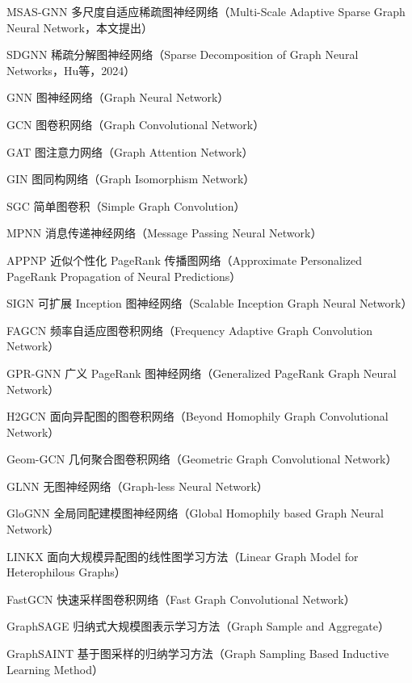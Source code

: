 
\begin{denotation}[4.0cm]

  \item[MSAS-GNN] 多尺度自适应稀疏图神经网络（Multi-Scale Adaptive Sparse Graph Neural Network，本文提出）
  \item[SDGNN] 稀疏分解图神经网络（Sparse Decomposition of Graph Neural Networks，Hu等，2024）
  \item[GNN] 图神经网络（Graph Neural Network）
  \item[GCN] 图卷积网络（Graph Convolutional Network）
  \item[GAT] 图注意力网络（Graph Attention Network）
  \item[GIN] 图同构网络（Graph Isomorphism Network）
  \item[SGC] 简单图卷积（Simple Graph Convolution）
  \item[MPNN] 消息传递神经网络（Message Passing Neural Network）
  \item[APPNP] 近似个性化 PageRank 传播图网络（Approximate Personalized PageRank Propagation of Neural Predictions）
  \item[SIGN] 可扩展 Inception 图神经网络（Scalable Inception Graph Neural Network）
  \item[FAGCN] 频率自适应图卷积网络（Frequency Adaptive Graph Convolution Network）
  \item[GPR-GNN] 广义 PageRank 图神经网络（Generalized PageRank Graph Neural Network）
  \item[H2GCN] 面向异配图的图卷积网络（Beyond Homophily Graph Convolutional Network）
  \item[Geom-GCN] 几何聚合图卷积网络（Geometric Graph Convolutional Network）
  \item[GLNN] 无图神经网络（Graph-less Neural Network）
  \item[GloGNN] 全局同配建模图神经网络（Global Homophily based Graph Neural Network）
  \item[LINKX] 面向大规模异配图的线性图学习方法（Linear Graph Model for Heterophilous Graphs）
  \item[FastGCN] 快速采样图卷积网络（Fast Graph Convolutional Network）
  \item[GraphSAGE] 归纳式大规模图表示学习方法（Graph Sample and Aggregate）
  \item[GraphSAINT] 基于图采样的归纳学习方法（Graph Sampling Based Inductive Learning Method）

\end{denotation}
